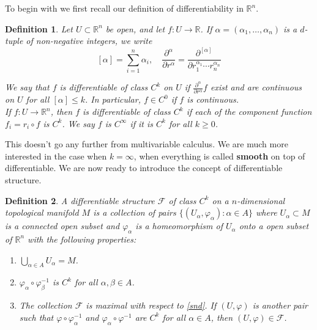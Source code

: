 \documentclass[twoside]{article}
\newtheorem{definition}{Definition}
\begin{document}
			To begin with we first recall our definition of differentiability in $\mathbb{R}^n$. 
			
			\begin{definition}
				Let $U \subset \mathbb{R}^n$ be open, and let $f:U \to \mathbb{R}$. If $\alpha = (\alpha_1,\dots,\alpha_n)$ is a $d$-tuple of non-negative integers, we write
				\[
					[\alpha]= \sum_{i=1}^{n}\alpha_i, \quad \frac{\partial^\alpha}{\partial r^\alpha} = \frac{\partial^{[\alpha]}}{\partial r_1^{\alpha_1} \cdots r_n^{\alpha_n}}
				\]
				
				We say that $f$ is differentiable of class $C^k$ on $U$ if $\frac{\partial^\alpha}{\partial r^\alpha}f$ exist and are continuous on $U$ for all $[\alpha] \le k$. In particular, $f \in C^0$ if $f$ is continuous. \\
				If $f:U \to \mathbb{R}^n$, then $f$ is differentiable of class $C^k$ if each of the component function $f_i = r_i \circ f$ is $C^k$. We say $f$ is $C^\infty$ if it is $C^k$ for all $k \ge 0$.
			\end{definition}
		
			This doesn't go any further from multivariable calculus. We are much more interested in the case when $k=\infty$, when everything is called \textbf{smooth} on top of differentiable. We are now ready to introduce the concept of differentiable structure.
			
			\begin{definition}
				A \textit{differentiable structure} $\mathscr{F}$ of class $C^k$ on a $n$-dimensional topological manifold $M$ is a collection of pairs $\{(U_\alpha,\varphi_\alpha):\alpha \in A\}$ where $U_\alpha \subset M$ is a connected open subset and $\varphi_\alpha$ is a homeomorphism of $U_\alpha$ onto a open subset of $\mathbb{R}^n$ with the following properties:
				\begin{enumerate}
					\item $\bigcup_{\alpha \in A}U_\alpha = M$. \label{fst}
					\item $\varphi_\alpha \circ \varphi_\beta^{-1}$ is $C^k$ for all $\alpha, \beta \in A$. \label{snd}
					\item The collection $\mathscr{F}$ is maximal with respect to \ref{snd}. If $(U,\varphi)$ is another pair such that $\varphi \circ \varphi_\alpha^{-1}$ and $\varphi_\alpha \circ \varphi^{-1}$ are $C^k$ for all $\alpha \in A$, then $(U,\varphi) \in \mathscr{F}$.
				\end{enumerate}
			\end{definition}
			
\end{document}
